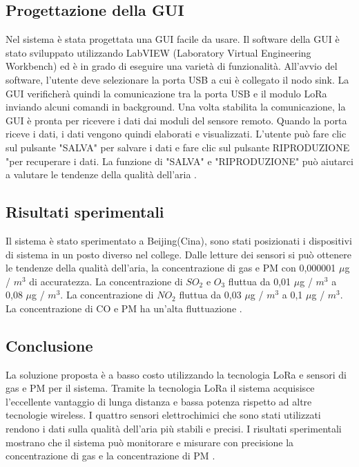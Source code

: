 \documentclass[a4paper]{report} %
\begin{document}
\subsection{Progettazione della GUI}
Nel sistema è stata progettata una GUI facile da usare. Il software della GUI è stato sviluppato utilizzando LabVIEW (Laboratory Virtual Engineering Workbench) ed è in grado di eseguire una varietà di funzionalità. All'avvio del software, l'utente deve selezionare la porta USB a cui è collegato il nodo sink. La GUI verificherà quindi la comunicazione tra la porta USB e il modulo LoRa inviando alcuni comandi in background. Una volta stabilita la comunicazione, la GUI è pronta per ricevere i dati dai moduli del sensore remoto. Quando la porta riceve i dati, i dati vengono quindi elaborati e visualizzati. L'utente può fare clic sul pulsante "SALVA" per salvare i dati e fare clic sul pulsante RIPRODUZIONE "per recuperare i dati. La funzione di "SALVA" e "RIPRODUZIONE" può aiutarci a valutare le tendenze della qualità dell'aria \cite{art:rif.40}. 

\subsection{Risultati sperimentali}
Il sistema è stato sperimentato a Beijing(Cina), sono stati posizionati i dispositivi di sistema in un posto diverso nel college. Dalle letture dei sensori si può ottenere le tendenze della qualità dell'aria, la concentrazione di gas e PM con 0,000001 $\mu$g / $ m^3 $ di accuratezza. La concentrazione di $ SO_{2} $ e $ O_{3} $ fluttua da 0,01 $\mu$g / $ m^3 $ a 0,08 $\mu$g / $m^3$. La concentrazione di $ NO_{2} $ fluttua da 0,03 $\mu$g / $m^3$ a 0,1 $\mu$g / $m^3$. La concentrazione di CO e PM ha un'alta fluttuazione \cite{art:rif.40}.

\subsection{Conclusione}
La soluzione proposta è a basso costo utilizzando la tecnologia LoRa e sensori di gas e PM per il sistema. Tramite la tecnologia LoRa il sistema acquisisce l'eccellente vantaggio di lunga distanza e bassa potenza rispetto ad altre tecnologie wireless. I quattro sensori elettrochimici che sono stati utilizzati rendono i dati sulla qualità dell'aria più stabili e precisi. I risultati sperimentali mostrano che il sistema può monitorare e misurare con precisione la concentrazione di gas e la concentrazione di PM \cite{art:rif.40}.




\end{document}
